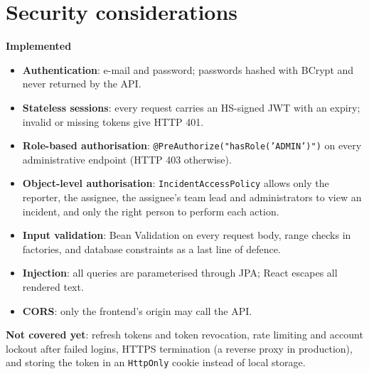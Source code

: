 \documentclass[11pt,a4paper]{article}
\begin{document}
\section{Security considerations}\label{sec:security}
\textbf{Implemented}
\begin{itemize}
\item \textbf{Authentication}: e-mail and password; passwords hashed with BCrypt and never returned by the API.
\item \textbf{Stateless sessions}: every request carries an HS-signed JWT with an expiry; invalid or missing tokens give HTTP 401.
\item \textbf{Role-based authorisation}: \texttt{@PreAuthorize("hasRole('ADMIN')")} on every administrative endpoint (HTTP 403 otherwise).
\item \textbf{Object-level authorisation}: \texttt{IncidentAccessPolicy} allows only the reporter, the assignee, the assignee's team lead and administrators to view an incident, and only the right person to perform each action.
\item \textbf{Input validation}: Bean Validation on every request body, range checks in factories, and database constraints as a last line of defence.
\item \textbf{Injection}: all queries are parameterised through JPA; React escapes all rendered text.
\item \textbf{CORS}: only the frontend's origin may call the API.
\end{itemize}

\textbf{Not covered yet}: refresh tokens and token revocation, rate limiting and account lockout after failed logins, HTTPS termination (a reverse proxy in production), and storing the token in an \texttt{HttpOnly} cookie instead of local storage.

\end{document}
